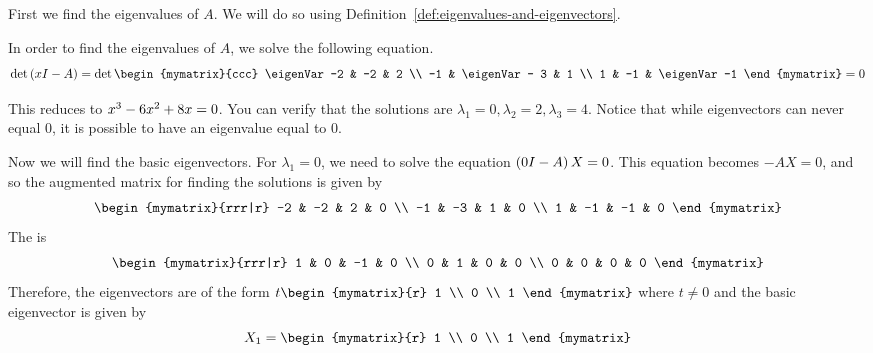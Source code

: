 \begin{solution}
First we find the eigenvalues of $A$. We will do so using Definition~\ref{def:eigenvalues-and-eigenvectors}. 

In order to find the eigenvalues of $A$, we solve the following equation.
\begin{equation*}
\det \tup{\eigenVar I -A } =
\det  \begin{mymatrix}{ccc}
\eigenVar -2 & -2 & 2 \\
 -1 & \eigenVar - 3  & 1 \\
1 & -1 &  \eigenVar  -1 
\end{mymatrix}
 =0
\end{equation*}

This reduces to $ x^{3}-6 x^{2}+8x =0$. You can verify that the
solutions are $ \lambda_1 = 0, \lambda_2 = 2, \lambda_3 = 4$.
Notice that while eigenvectors can never equal $0$, it is possible to have an eigenvalue equal to $0$. 

Now we will find the basic eigenvectors. For $\lambda_1 =0$, we need to solve the equation
$\left(0 I - A \right) X = 0$. This equation becomes $-AX=0$, and so the augmented matrix for finding
the solutions is given by 
\begin{equation*}
\begin{mymatrix}{rrr|r}
-2 & -2 & 2 & 0 \\
-1 & -3 & 1 & 0 \\
1 & -1 & -1 & 0
\end{mymatrix}
\end{equation*}
The {\rref} is
\begin{equation*}
\begin{mymatrix}{rrr|r}
1 & 0 & -1 & 0 \\
0 & 1 &  0 & 0 \\
0 & 0 &  0 & 0
\end{mymatrix}
\end{equation*}
Therefore, the eigenvectors are of the form $ t\begin{mymatrix}{r}
1 \\
0 \\
1
\end{mymatrix}$ where $t\neq 0$ and the basic eigenvector is given by
\begin{equation*}
X_1
=
\begin{mymatrix}{r}
1 \\
0 \\
1
\end{mymatrix}
\end{equation*}


\end{solution}
